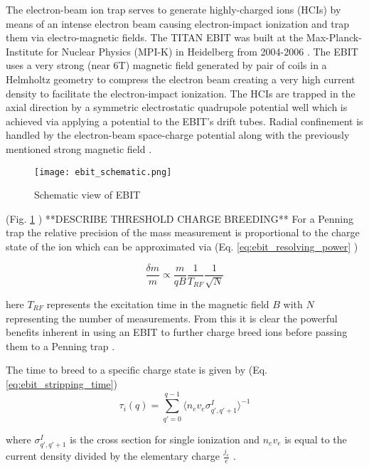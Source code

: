 \documentclass[cnatzke_thesis_proposal.tex]{subfiles}
\begin{document}
The electron-beam ion trap serves to generate highly-charged ions (HCIs) by means of an intense electron beam causing electron-impact ionization and trap them via electro-magnetic fields.  The TITAN EBIT was built at the Max-Planck-Institute for Nuclear Physics (MPI-K) in Heidelberg from 2004-2006 \cite{TITAN_EBIT_2010}.  The EBIT uses a very strong (near 6T) magnetic field generated by pair of coils in a Helmholtz geometry to compress the electron beam creating a very high current density to facilitate the electron-impact ionization.  The HCIs are trapped in the axial direction by a symmetric electrostatic quadrupole potential well which is achieved via applying a potential to the EBIT's drift tubes.  Radial confinement is handled by the electron-beam space-charge potential along with the previously mentioned strong magnetic field \cite{TITAN_EBIT_2010}.

\begin{figure}[H]
  \begin{center}
    \texttt{[image: ebit\_schematic.png]}
  \end{center}
  \caption{Schematic view of EBIT \cite{PALFFY_THESIS}}
  \label{fig:schematic_ebit}
\end{figure}

(Fig. \ref{fig:schematic_ebit} )
**DESCRIBE  THRESHOLD CHARGE BREEDING**
For a Penning trap the relative precision of the mass measurement is proportional to the charge state of the ion which can be approximated via (Eq. \ref{eq:ebit_resolving_power} \cite{TITAN_EBIT_2010})


\begin{equation}
  \frac{\delta m}{m} \propto \frac{m}{qB} \frac{1}{T_{RF}} \frac{1}{\sqrt{N}}
  \label{eq:ebit_resolving_power}
\end{equation}

here $T_{RF}$ represents the excitation time in the magnetic field $B$ with $N$ representing the number of measurements.  From this it is clear the powerful benefits inherent in using an EBIT to further charge breed ions before passing them to a Penning trap \cite{TITAN_EBIT_2010}.

The time to breed to a specific charge state is given by (Eq. \ref{eq:ebit_stripping_time})
\begin{equation}
  \tau_{i}(q) = \sum_{q'=0}^{q-1}\langle n_e v_e \sigma^{I}_{q', q'+1} \rangle^{-1}
  \label{eq:ebit_stripping_time}
\end{equation}

where $\sigma^{I}_{q', q'+1}$ is the cross section for single ionization and $n_e v_e$ is equal to the current density divided by the elementary charge $\frac{j_e}{e}$ \cite{SPRINGER_1997}.
\end{document}
